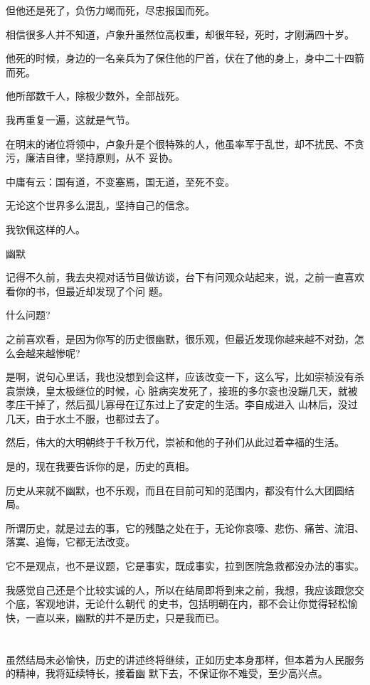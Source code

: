 \documentclass[11pt,a4paper,onecolumn]{article}
\begin{document}
但他还是死了，负伤力竭而死，尽忠报国而死。

相信很多人并不知道，卢象升虽然位高权重，却很年轻，死时，才刚满四十岁。

他死的时候，身边的一名亲兵为了保住他的尸首，伏在了他的身上，身中二十四箭而死。

他所部数千人，除极少数外，全部战死。

我再重复一遍，这就是气节。

在明末的诸位将领中，卢象升是个很特殊的人，他虽率军于乱世，却不扰民、不贪污，廉洁自律，坚持原则，从不
妥协。

中庸有云：国有道，不变塞焉，国无道，至死不变。

无论这个世界多么混乱，坚持自己的信念。

我钦佩这样的人。

幽默

记得不久前，我去央视对话节目做访谈，台下有问观众站起来，说，之前一直喜欢看你的书，但最近却发现了个问
题。

什么问题?

之前喜欢看，是因为你写的历史很幽默，很乐观，但最近发现你越来越不对劲，怎么会越来越惨呢?

是啊，说句心里话，我也没想到会这样，应该改变一下，这么写，比如崇祯没有杀袁崇焕，皇太极继位的时候，心
脏病突发死了，接班的多尔衮也没蹦几天，就被孝庄干掉了，然后孤儿寡母在辽东过上了安定的生活。李自成进入
山林后，没过几天，由于水土不服，也都过去了。

然后，伟大的大明朝终于千秋万代，崇祯和他的子孙们从此过着幸福的生活。

是的，现在我要告诉你的是，历史的真相。

历史从来就不幽默，也不乐观，而且在目前可知的范围内，都没有什么大团圆结局。

所谓历史，就是过去的事，它的残酷之处在于，无论你哀嚎、悲伤、痛苦、流泪、落寞、追悔，它都无法改变。

它不是观点，也不是议题，它是事实，既成事实，拉到医院急救都没办法的事实。

我感觉自己还是个比较实诚的人，所以在结局即将到来之前，我想，我应该跟您交个底，客观地讲，无论什么朝代
的史书，包括明朝在内，都不会让你觉得轻松愉快，一直以来，幽默的并不是历史，只是我而已。

\section[\thesection]{}

虽然结局未必愉快，历史的讲述终将继续，正如历史本身那样，但本着为人民服务的精神，我将延续特长，接着幽
默下去，不保证你不难受，至少高兴点。
\end{document}
